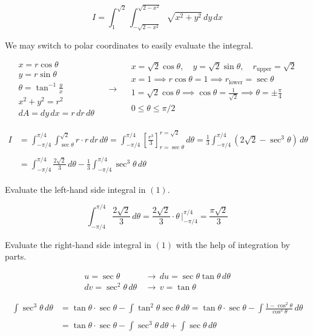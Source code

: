 \documentclass{article}
\begin{document}
\[{I}=\int_1^{\sqrt2}\int_{-\sqrt{2-x^2}}^{\sqrt{2-x^2}}\sqrt{x^2+y^2}\,dy\,dx\]

We may switch to polar coordinates to easily evaluate the integral.

\[
\begin{array}{c}
x=r\cos\theta\\
y=r\sin\theta\\[0.2cm]
\displaystyle\theta=\tan^{-1}\frac yx\\[0.2cm]
x^2+y^2=r^2\\
dA=dy\,dx =r\,dr\,d\theta
\end{array}\quad\rightarrow\quad
\begin{array}{c}
x=\sqrt2\cos\theta,\quad y=\sqrt2\sin\theta,\quad r_{\text{upper}}=\sqrt2\\[1em]
x=1\implies r\cos\theta=1\implies r_{\text{lower}}=\sec\theta\\[1em]
\displaystyle1=\sqrt2\cos\theta\implies\cos\theta=\frac1{\sqrt2}\implies\theta=\pm\frac\pi4\\[1em]
0\leq\theta\leq \pi/2\\
\end{array}
\]

\begin{align}{I}&=\int_{-\pi/4}^{\pi/4}\int_{\sec\theta}^{\sqrt2}r\cdot r\,dr\,d\theta=\int_{-\pi/4}^{\pi/4}\left[\frac{r^3}3\right]_{r=\sec\theta}^{r=\sqrt2}\,d\theta=\frac13\int_{-\pi/4}^{\pi/4}\left(2\sqrt2-\sec^3\theta\right) \,d\theta\nonumber\\\nonumber\\&=\int_{-\pi/4}^{\pi/4}\frac{2\sqrt2}3\,d\theta-\frac13\int_{-\pi/4}^{\pi/4}\sec^3\theta\,d\theta\end{align}

Evaluate the left-hand side integral in $(1)$.

\[\int_{-\pi/4}^{\pi/4}\frac{2\sqrt2}3\,d\theta=\frac{2\sqrt2}3\cdot\theta\,\bigg|_{-\pi/4}^{\pi/4}=\frac{\pi\sqrt2}3\]

Evaluate the right-hand side integral in $(1)$ with the help of integration by parts.

\begin{align*}u=\sec\theta\,&\rightarrow\,du=\sec\theta\tan\theta\,d\theta\\dv=\sec^2\theta\,d\theta\,&\rightarrow\,v=\tan\theta\end{align*}

\begin{align*}
\int\sec^3\theta\,d\theta&=\tan\theta\cdot\sec\theta-\int\tan^2\theta\sec\theta\,d\theta=\tan\theta\cdot\sec\theta-\int\frac{1-\cos^2\theta}{\cos^3\theta}\,d\theta\\\\&=\tan\theta\cdot\sec\theta-\int\sec^3\theta\,d\theta+\int\sec\theta\,d\theta
\end{align*}
\end{document}
